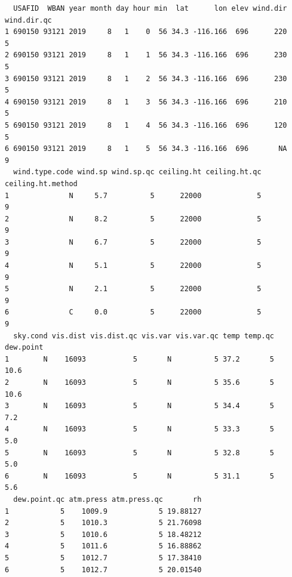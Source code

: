 \documentclass[
  letterpaper,
  DIV=11,
  numbers=noendperiod]{scrartcl}
\newenvironment{Shaded}{\begin{snugshade}}{\end{snugshade}}
\newcommand{\FunctionTok}[1]{\textcolor[rgb]{0.28,0.35,0.67}{#1}}
\newcommand{\NormalTok}[1]{\textcolor[rgb]{0.00,0.23,0.31}{#1}}
\newcommand{\OtherTok}[1]{\textcolor[rgb]{0.00,0.23,0.31}{#1}}
\newcommand{\SpecialCharTok}[1]{\textcolor[rgb]{0.37,0.37,0.37}{#1}}
\newcommand{\StringTok}[1]{\textcolor[rgb]{0.13,0.47,0.30}{#1}}
\begin{document}
\begin{verbatim}
  USAFID  WBAN year month day hour min  lat      lon elev wind.dir wind.dir.qc
1 690150 93121 2019     8   1    0  56 34.3 -116.166  696      220           5
2 690150 93121 2019     8   1    1  56 34.3 -116.166  696      230           5
3 690150 93121 2019     8   1    2  56 34.3 -116.166  696      230           5
4 690150 93121 2019     8   1    3  56 34.3 -116.166  696      210           5
5 690150 93121 2019     8   1    4  56 34.3 -116.166  696      120           5
6 690150 93121 2019     8   1    5  56 34.3 -116.166  696       NA           9
  wind.type.code wind.sp wind.sp.qc ceiling.ht ceiling.ht.qc ceiling.ht.method
1              N     5.7          5      22000             5                 9
2              N     8.2          5      22000             5                 9
3              N     6.7          5      22000             5                 9
4              N     5.1          5      22000             5                 9
5              N     2.1          5      22000             5                 9
6              C     0.0          5      22000             5                 9
  sky.cond vis.dist vis.dist.qc vis.var vis.var.qc temp temp.qc dew.point
1        N    16093           5       N          5 37.2       5      10.6
2        N    16093           5       N          5 35.6       5      10.6
3        N    16093           5       N          5 34.4       5       7.2
4        N    16093           5       N          5 33.3       5       5.0
5        N    16093           5       N          5 32.8       5       5.0
6        N    16093           5       N          5 31.1       5       5.6
  dew.point.qc atm.press atm.press.qc       rh
1            5    1009.9            5 19.88127
2            5    1010.3            5 21.76098
3            5    1010.6            5 18.48212
4            5    1011.6            5 16.88862
5            5    1012.7            5 17.38410
6            5    1012.7            5 20.01540
\end{verbatim}

\begin{Shaded}
\end{Shaded}
\end{document}
